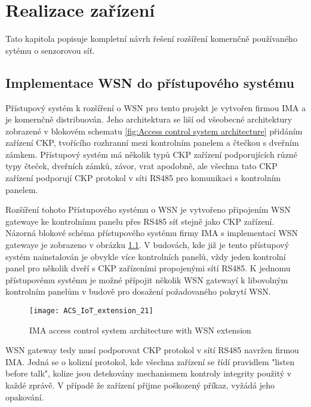 \chapter{Realizace zařízení}
Tato kapitola popisuje kompletní návrh řešení rozšíření komernčně používaného sytému o senzorovou síť.



\section{Implementace WSN do přístupového systému}
\label{Implementace WSN do přístupového systému}
Přístupový systém k rozšíření o WSN pro tento projekt je vytvořen firmou IMA a je komernčně distribuován. Jeho architektura se liší od všeobecné architektury zobrazené v blokovém schematu \ref{fig:Access control system architecture} přidáním zařízení CKP, tvořícího rozhranní mezi kontrolním panelem a čtečkou s dveřním zámkem. Přístupový systém má několik typů CKP zařízení podporujících různé typy čteček, dveřních zámků, závor, vrat apodobně, ale všechna tato CKP zařízení podporují CKP protokol v síti RS485 pro komunikaci s kontrolním panelem.

Rozšíření tohoto Přístupového systému o WSN je vytvořeno připojením WSN gatewaye ke kontrolnímu panelu přes RS485 síť stejně jako CKP zařízení. Názorná blokové schéma přístupového systému firmy IMA s implementací WSN gatewaye je zobrazeno v obrázku \ref{fig:ACS architecture IMA with geteway}.
V budovách, kde již je tento přístupový systém nainstalován je obvykle více kontrolních panelů, vždy jeden kontrolní panel pro několik dveří s CKP zařízeními propojenými sítí RS485. 
K jednomu přístupovému systému je možné přípojit několik WSN gatewayí k libovolným kontrolním panelům v budově pro dosažení požadovaného pokrytí WSN.

\begin{figure}[!h]
\centering
\texttt{[image: ACS\_IoT\_extension\_21]}
\caption{IMA access control system architecture with WSN extension}
\label{fig:ACS architecture IMA with geteway}
\end{figure}


WSN gateway tedy musí podporovat CKP protokol v sítí RS485 navržen firmou IMA. Jedná se o kolizní protokol, kde všechna zařízení se řídí pravidlem "listen before talk", kolize jsou detekovány 
mechanismem kontroly integrity použitý v každé zprávě. V případě že zařízení přijme poškozený příkaz, vyžádá jeho opakování.

